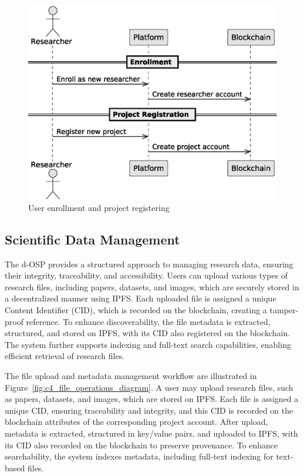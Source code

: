 \documentclass[final]{rc-book-2.14}
\begin{document}
\begin{figure}[htbp]
    \centering
    \includegraphics[scale=0.5]{fig/c4_platform_operations_1_2.eps}
    \caption{User enrollment and project registering}
    \label{fig:c4_operations_1}
\end{figure}

\subsection{Scientific Data Management}

The d-OSP provides a structured approach to managing research data, ensuring their integrity, traceability, and accessibility. Users can upload various types of research files, including papers, datasets, and images, which are securely stored in a decentralized manner using IPFS. Each uploaded file is assigned a unique Content Identifier (CID), which is recorded on the blockchain, creating a tamper-proof reference. To enhance discoverability, the file metadata is extracted, structured, and stored on IPFS, with its CID also registered on the blockchain. The system further supports indexing and full-text search capabilities, enabling efficient retrieval of research files.

The file upload and metadata management workflow are illustrated in Figure~\ref{fig:c4_file_operations_diagram}. A user may upload research files, such as papers, datasets, and images, which are stored on IPFS. Each file is assigned a unique CID, ensuring traceability and integrity, and this CID is recorded on the blockchain attributes of the corresponding project account. After upload, metadata is extracted, structured in key/value pairs, and uploaded to IPFS, with its CID also recorded on the blockchain to preserve provenance. To enhance searchability, the system indexes metadata, including full-text indexing for text-based files.
\end{document}
